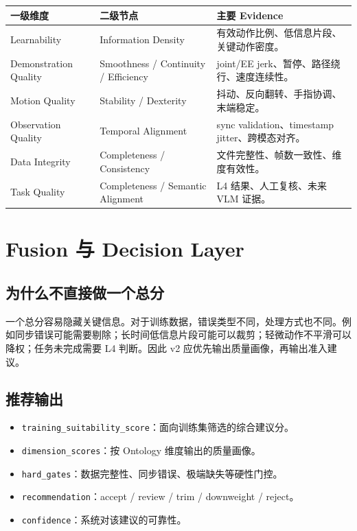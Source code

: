 \documentclass[UTF8,zihao=-4]{ctexart}
\newcommand{\Code}[1]{\texttt{#1}}
\begin{document}
\begin{longtable}{L{4cm} L{4cm} L{5.7cm}}
\toprule
一级维度 & 二级节点 & 主要 Evidence \\
\midrule
Learnability & Information Density & 有效动作比例、低信息片段、关键动作密度。 \\
Demonstration Quality & Smoothness / Continuity / Efficiency & joint/EE jerk、暂停、路径绕行、速度连续性。 \\
Motion Quality & Stability / Dexterity & 抖动、反向翻转、手指协调、末端稳定。 \\
Observation Quality & Temporal Alignment & sync validation、timestamp jitter、跨模态对齐。 \\
Data Integrity & Completeness / Consistency & 文件完整性、帧数一致性、维度有效性。 \\
Task Quality & Completeness / Semantic Alignment & L4 结果、人工复核、未来 VLM 证据。 \\
\bottomrule
\end{longtable}

\section{Fusion 与 Decision Layer}

\subsection{为什么不直接做一个总分}

一个总分容易隐藏关键信息。对于训练数据，错误类型不同，处理方式也不同。例如同步错误可能需要剔除；长时间低信息片段可能可以裁剪；轻微动作不平滑可以降权；任务未完成需要 L4 判断。因此 v2 应优先输出质量画像，再输出准入建议。

\subsection{推荐输出}

\begin{itemize}
\item \Code{training\_suitability\_score}：面向训练集筛选的综合建议分。
\item \Code{dimension\_scores}：按 Ontology 维度输出的质量画像。
\item \Code{hard\_gates}：数据完整性、同步错误、极端缺失等硬性门控。
\item \Code{recommendation}：accept / review / trim / downweight / reject。
\item \Code{confidence}：系统对该建议的可靠性。
\end{itemize}
\end{document}
